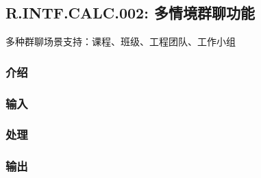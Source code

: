 \subsection{R.INTF.CALC.002: 多情境群聊功能}
多种群聊场景支持：课程、班级、工程团队、工作小组
\subsubsection{介绍}
\subsubsection{输入}
\subsubsection{处理}
\subsubsection{输出}